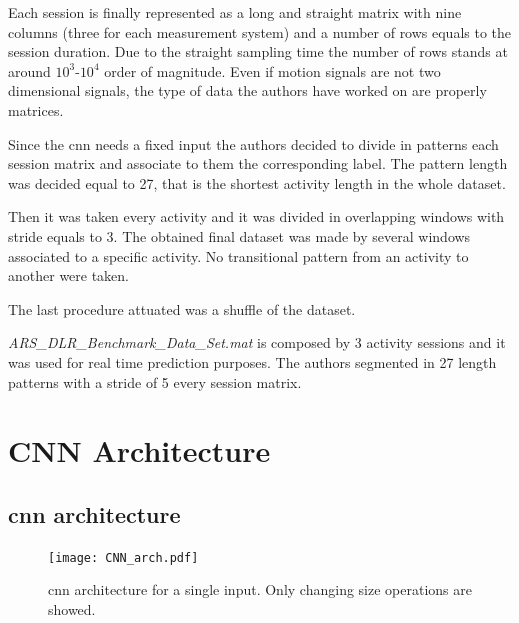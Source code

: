 
Each session is finally represented as a long and straight matrix with nine columns (three for each measurement system) and a number of rows equals to the session duration. Due to the straight sampling time the number of rows stands at around $10^3$-$10^4$ order of magnitude.
Even if motion signals are not two dimensional signals, the type of data the authors have worked on are properly matrices.


Since the \gls{cnn} needs a fixed input the authors decided to divide in patterns each session matrix and associate to them the corresponding label. The pattern length was decided equal to 27, that is the shortest activity length in the whole dataset. 

Then it was taken every activity and it was divided in overlapping windows with stride equals to 3. The obtained final dataset was made by several windows associated to a specific activity. No transitional pattern from an activity to another were taken.


The last procedure attuated was a shuffle of the dataset.


\textit{ARS\_DLR\_Benchmark\_Data\_Set.mat} is composed by 3 activity sessions and it was used for real time prediction purposes. The authors segmented in 27 length patterns with a stride of 5 every session matrix.  




\section{CNN Architecture}
\label{sec:cnn_architecture}

\subsection{\gls{cnn} architecture}

\begin{figure}[htp]
\texttt{[image: CNN\_arch.pdf]}
\caption{\gls{cnn} architecture for a single input. Only changing size operations are showed.}
\label{fig:CNN}
\end{figure}


